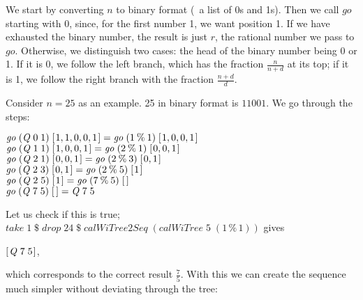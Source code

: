 \documentclass[tikz]{scrreprt}
\newcommand{\Conid}[1]{\mathit{#1}}
\newcommand{\Varid}[1]{\mathit{#1}}
\begin{document}
We start by converting $n$ to binary format
(\ie\ a list of 0s and 1s).
Then we call \ensuremath{\Varid{go}} starting with 0, since,
for the first number 1, we want position 1.
If we have exhausted the binary number,
the result is just $r$, the rational number we pass
to \ensuremath{\Varid{go}}. Otherwise, we distinguish two cases:
the head of the binary number being 0 or 1.
If it is 0, we follow the left branch,
which has the fraction $\frac{n}{n+d}$
at its top; if it is 1, we follow 
the right branch with the fraction $\frac{n+d}{d}$.

Consider $n=25$ as an example.
25 in binary format is $11001$.
We go through the steps:

\ensuremath{\Varid{go}\;(\Conid{Q}\;\mathrm{0}\;\mathrm{1})\;[\mskip1.5mu \mathrm{1},\mathrm{1},\mathrm{0},\mathrm{0},\mathrm{1}\mskip1.5mu]\mathrel{=}\Varid{go}\;(\mathrm{1}\mathbin{\%}\mathrm{1})\;[\mskip1.5mu \mathrm{1},\mathrm{0},\mathrm{0},\mathrm{1}\mskip1.5mu]}\\
\ensuremath{\Varid{go}\;(\Conid{Q}\;\mathrm{1}\;\mathrm{1})\;[\mskip1.5mu \mathrm{1},\mathrm{0},\mathrm{0},\mathrm{1}\mskip1.5mu]\mathrel{=}\Varid{go}\;(\mathrm{2}\mathbin{\%}\mathrm{1})\;[\mskip1.5mu \mathrm{0},\mathrm{0},\mathrm{1}\mskip1.5mu]}\\
\ensuremath{\Varid{go}\;(\Conid{Q}\;\mathrm{2}\;\mathrm{1})\;[\mskip1.5mu \mathrm{0},\mathrm{0},\mathrm{1}\mskip1.5mu]\mathrel{=}\Varid{go}\;(\mathrm{2}\mathbin{\%}\mathrm{3})\;[\mskip1.5mu \mathrm{0},\mathrm{1}\mskip1.5mu]}\\
\ensuremath{\Varid{go}\;(\Conid{Q}\;\mathrm{2}\;\mathrm{3})\;[\mskip1.5mu \mathrm{0},\mathrm{1}\mskip1.5mu]\mathrel{=}\Varid{go}\;(\mathrm{2}\mathbin{\%}\mathrm{5})\;[\mskip1.5mu \mathrm{1}\mskip1.5mu]}\\
\ensuremath{\Varid{go}\;(\Conid{Q}\;\mathrm{2}\;\mathrm{5})\;[\mskip1.5mu \mathrm{1}\mskip1.5mu]\mathrel{=}\Varid{go}\;(\mathrm{7}\mathbin{\%}\mathrm{5})\;[\mskip1.5mu \mskip1.5mu]}\\
\ensuremath{\Varid{go}\;(\Conid{Q}\;\mathrm{7}\;\mathrm{5})\;[\mskip1.5mu \mskip1.5mu]\mathrel{=}\Conid{Q}\;\mathrm{7}\;\mathrm{5}}

Let us check if this is true;
\ensuremath{\Varid{take}\;\mathrm{1}\mathbin{\$}\Varid{drop}\;\mathrm{24}\mathbin{\$}\Varid{calWiTree2Seq}\;(\Varid{calWiTree}\;\mathrm{5}\;(\mathrm{1}\mathbin{\%}\mathrm{1}))} gives

\ensuremath{[\mskip1.5mu \Conid{Q}\;\mathrm{7}\;\mathrm{5}\mskip1.5mu]},

which corresponds to the correct result $\frac{7}{5}$.
With this we can create the sequence much simpler
without deviating through the tree:
\end{document}
